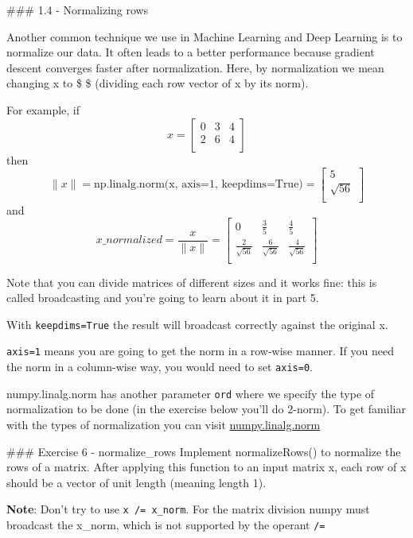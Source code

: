 \documentclass[11pt]{article}
\begin{document}
    \#\#\# 1.4 - Normalizing rows

Another common technique we use in Machine Learning and Deep Learning is
to normalize our data. It often leads to a better performance because
gradient descent converges faster after normalization. Here, by
normalization we mean changing x to \$  \$ (dividing
each row vector of x by its norm).

For example, if \[x = \begin{bmatrix}
        0 & 3 & 4 \\
        2 & 6 & 4 \\
\end{bmatrix}\tag{3}\] then
\[\| x\| = \text{np.linalg.norm(x, axis=1, keepdims=True)} = \begin{bmatrix}
    5 \\
    \sqrt{56} \\
\end{bmatrix}\tag{4} \] and
\[ x\_normalized = \frac{x}{\| x\|} = \begin{bmatrix}
    0 & \frac{3}{5} & \frac{4}{5} \\
    \frac{2}{\sqrt{56}} & \frac{6}{\sqrt{56}} & \frac{4}{\sqrt{56}} \\
\end{bmatrix}\tag{5}\]

Note that you can divide matrices of different sizes and it works fine:
this is called broadcasting and you're going to learn about it in part
5.

With \texttt{keepdims=True} the result will broadcast correctly against
the original x.

\texttt{axis=1} means you are going to get the norm in a row-wise
manner. If you need the norm in a column-wise way, you would need to set
\texttt{axis=0}.

numpy.linalg.norm has another parameter \texttt{ord} where we specify
the type of normalization to be done (in the exercise below you'll do
2-norm). To get familiar with the types of normalization you can visit
\href{https://numpy.org/doc/stable/reference/generated/numpy.linalg.norm.html}{numpy.linalg.norm}

\#\#\# Exercise 6 - normalize\_rows Implement normalizeRows() to
normalize the rows of a matrix. After applying this function to an input
matrix x, each row of x should be a vector of unit length (meaning
length 1).

\textbf{Note}: Don't try to use \texttt{x\ /=\ x\_norm}. For the matrix
division numpy must broadcast the x\_norm, which is not supported by the
operant \texttt{/=}
\end{document}
